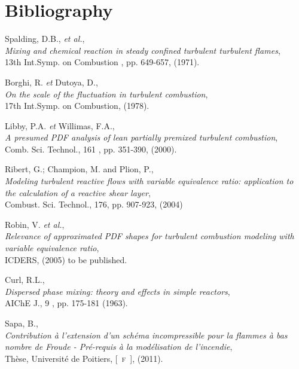 
\section*{Bibliography}
\begin{thebibliography}{7}

{\sc Spalding, D.B., {\em et al.}},\\
{\em Mixing and chemical reaction in steady confined turbulent turbulent flames},\\
13th Int.Symp. on Combustion , pp. 649-657, (1971).

{\sc Borghi, R. {\em et } Dutoya, D.},\\
{\em On the scale of the fluctuation in turbulent combustion},\\
17th Int.Symp. on Combustion, (1978).

{\sc Libby, P.A. {\em et } Willimas, F.A.},\\
{\em A presumed PDF analysis of lean partially premixed turbulent combustion},\\
Comb. Sci. Technol., 161 , pp. 351-390, (2000).

{\sc Ribert, G.; Champion, M. and Plion, P.},\\
{\em Modeling turbulent reactive flows with variable equivalence ratio: application to the calculation of a reactive shear layer},\\
Combust. Sci. Technol., 176, pp. 907-923, (2004)

{\sc Robin, V. {\em et al.}},\\
{\em Relevance of approximated PDF shapes for turbulent combustion modeling with variable equivalence ratio},\\
ICDERS, (2005) to be published.

{\sc Curl, R.L.},\\
{\em Dispersed phase mixing: theory and effects in simple reactors},\\
AIChE J., 9 , pp. 175-181 (1963).

{\sc Sapa, B.},\\
{\em Contribution \`a l'extension d'un sch\'ema incompressible pour la flammes \`a bas nombre de Froude - Pr\'e-requis \`a la mod\'elisation de l'incendie},\\
Th\`ese, Universit\'e de Poitiers, [\mbox{\textsc{ f }}], (2011).


\end{thebibliography}
\newpage

